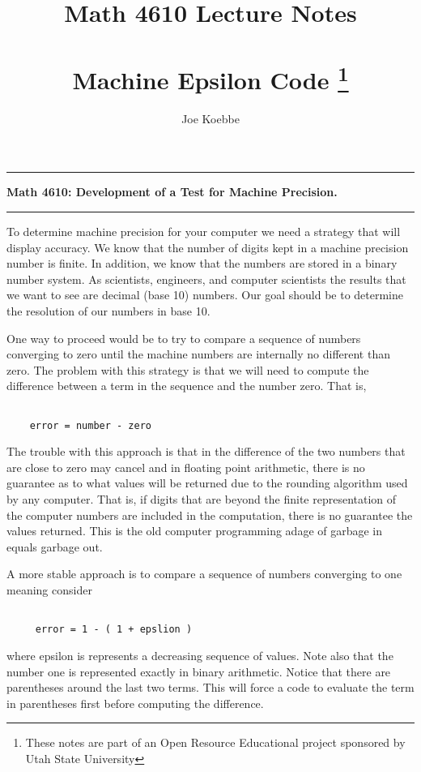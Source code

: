 \documentclass[10pt,fleqn]{article}
\title{Math 4610 Lecture Notes \\
            \ \\
            Machine Epsilon Code 
  \footnote{These notes are part of an Open Resource Educational project
            sponsored by Utah State University}}
\author{Joe Koebbe}
\begin{document}
\maketitle
\newpage
\vskip0.1in\hrule\vskip0.1in
\noindent
{\bf Math 4610: Development of a Test for Machine Precision.}
\vskip0.1in\hrule\vskip0.1in
\noindent
To determine machine precision for your computer we need a strategy that will
display accuracy. We know that the number of digits kept in a machine precision
number is finite. In addition, we know that the numbers are stored in a binary
number system. As scientists, engineers, and computer scientists the results
that we want to see are decimal (base 10) numbers. Our goal should be to
determine the resolution of our numbers in base 10.

One way to proceed would be to try to compare a sequence of numbers converging
to zero until the machine numbers are internally no different than zero. The
problem with this strategy is that we will need to compute the difference
between a term in the sequence and the number zero. That is,
\begin{verbatim}
 
    error = number - zero

\end{verbatim}
The trouble with this approach is that in the difference of the two numbers
that are close to zero may cancel and in floating point arithmetic, there is
no guarantee as to what values will be returned due to the rounding algorithm
used by any computer. That is, if digits that are beyond the finite
representation of the computer numbers are included in the computation, there is
no guarantee the values returned. This is the old computer programming adage of
garbage in equals garbage out.

A more stable approach is to compare a sequence of numbers converging to one
meaning consider
\begin{verbatim}

     error = 1 - ( 1 + epslion )

\end{verbatim}
where epsilon is represents a decreasing sequence of values. Note also that the
number one is represented exactly in binary arithmetic. Notice that there are
parentheses around the last two terms. This will force a code to evaluate the
term in parentheses first before computing the difference. 
\end{document}
